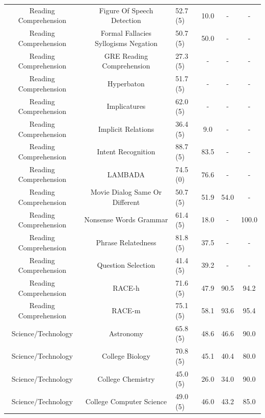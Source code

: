 \documentclass[11pt, a4paper, logo, internal, copyright, nonumbering]{deepmind}
\begin{document}
\begin{center}
\begin{longtable}{cclccc}
  Reading Comprehension &            Figure Of Speech Detection &   52.7 (5) &  10.0 &   - &          - \\
  Reading Comprehension &  Formal Fallacies Syllogisms Negation &   50.7 (5) &  50.0 &   - &          - \\
  Reading Comprehension &             GRE Reading Comprehension &   27.3 (5) &   - &   - &          - \\
  Reading Comprehension &                            Hyperbaton &   51.7 (5) &   - &   - &          - \\
  Reading Comprehension &                          Implicatures &   62.0 (5) &   - &   - &          - \\
  Reading Comprehension &                    Implicit Relations &   36.4 (5) &   9.0 &   - &          - \\
  Reading Comprehension &                  Intent Recognition &   88.7 (5) &  83.5 &   - &          - \\
  Reading Comprehension &                              LAMBADA &   74.5 (0) &   76.6 &   - &          - \\
  Reading Comprehension &      Movie Dialog Same Or Different &   50.7 (5) &  51.9 &  54.0 &          - \\
  Reading Comprehension &                Nonsense Words Grammar &   61.4 (5) &  18.0 &   - &        100.0 \\
  Reading Comprehension &                    Phrase Relatedness &   81.8 (5) &  37.5 &   - &          - \\
  Reading Comprehension &                  Question Selection &   41.4 (5) &  39.2 &   - &          - \\
  Reading Comprehension &                              RACE-h &   71.6 (5) &  47.9 &  90.5 &         94.2 \\
  Reading Comprehension &                              RACE-m &   75.1 (5) &  58.1 &  93.6 &         95.4 \\
     Science/Technology &                            Astronomy &   65.8 (5) &  48.6 &  46.6 &         90.0 \\
     Science/Technology &                      College Biology &   70.8 (5) &  45.1 &  40.4 &         80.0 \\
     Science/Technology &                    College Chemistry &   45.0 (5) &  26.0 &  34.0 &         90.0 \\
     Science/Technology &             College Computer Science &   49.0 (5) &  46.0 &  43.2 &         85.0 \\

\end{longtable}
\end{center}
\end{document}

